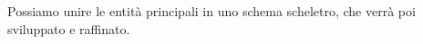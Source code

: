 Possiamo unire le entità principali in uno schema scheletro, che verrà poi sviluppato e raffinato.

